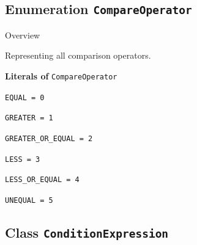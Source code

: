 \subsection{Enumeration \bfseries \texttt{CompareOperator}\normalfont}
\label{cls:uppaal::expressions::CompareOperator} 

	\begin{longdescription}
		\item[Overview] 		
				

	

		Representing all comparison operators.		
	
		\item[\textbf{Literals of} \texttt{CompareOperator}] ~
		\begin{longdescription}
			
\item[\texttt{EQUAL = 0}] ~
\nopagebreak

\item[\texttt{GREATER = 1}] ~
\nopagebreak

\item[\texttt{GREATER\_OR\_EQUAL = 2}] ~
\nopagebreak

\item[\texttt{LESS = 3}] ~
\nopagebreak

\item[\texttt{LESS\_OR\_EQUAL = 4}] ~
\nopagebreak

\item[\texttt{UNEQUAL = 5}] ~
\nopagebreak
		\end{longdescription}
	\end{longdescription}
	
	

\subsection{Class \bfseries \texttt{ConditionExpression}\normalfont}
\label{cls:uppaal::expressions::ConditionExpression} 
	
